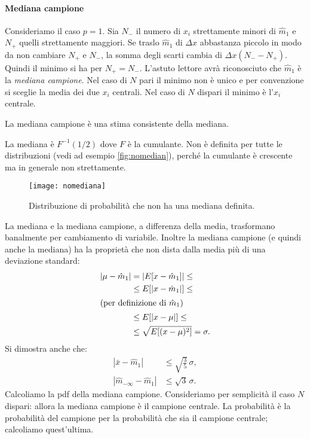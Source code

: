 \paragraph{Mediana campione}

Consideriamo il caso $p=1$.
Sia $N_-$ il numero di $x_i$ strettamente minori di $\hat m_1$ e $N_+$ quelli strettamente maggiori.
Se traslo $\hat m_1$ di $\Delta x$ abbastanza piccolo in modo da non cambiare $N_+$ e $N_-$,
la somma degli scarti cambia di $\Delta x(N_- - N_+)$.
Quindi il minimo si ha per $N_+ = N_-$.
L'astuto lettore avrà riconosciuto che $\hat m_1$ è la \emph{mediana campione}.
Nel caso di $N$ pari il minimo non è unico e per convenzione si sceglie la media dei due $x_i$ centrali.
Nel caso di $N$ dispari il minimo è l'$x_i$ centrale.
\begin{fact}
	La mediana campione è una stima consistente della mediana.
\end{fact}
\noindent La mediana è $F^{-1}(1/2)$ dove $F$ è la cumulante.
Non è definita per tutte le distribuzioni (vedi ad esempio \autoref{fig:nomedian}),
perché la cumulante è crescente ma in generale non strettamente.
\begin{figure}
	\centering
	\texttt{[image: nomediana]}
	\caption{\label{fig:nomedian}%
	Distribuzione di probabilità che non ha una mediana definita.}
\end{figure}
La mediana e la mediana campione,
a differenza della media,
trasformano banalmente per cambiamento di variabile.
Inoltre la mediana campione (e quindi anche la mediana) ha la proprietà che non dista dalla media più di una deviazione standard:
\begin{align*}
	|\mu-\hat m_1|
	&= |E[x-\hat m_1]| \le \\
	&\le E[|x-\hat m_1|] \le \\
	\intertext{(per definizione di $\hat m_1$)}
	&\le E[|x-\mu|] \le \\
	&\le \sqrt{E[(x-\mu)^2]} = \sigma.
\end{align*}
Si dimostra anche che:
\begin{align*}
	|\bar x - \hat m_1|
	&\le \sqrt{\frac35}\,\sigma, \\
	|\hat m_{-\infty} - \hat m_1|
	&\le \sqrt3\,\sigma.
\end{align*}
Calcoliamo la pdf della mediana campione.
Consideriamo per semplicità il caso $N$ dispari:
allora la mediana campione è il campione centrale.
La probabilità è la probabilità del campione per la probabilità che sia il campione centrale;
calcoliamo quest'ultima.

